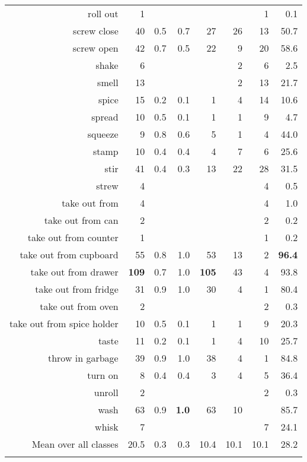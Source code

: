 \begin{tabular}{r r r@{\ \ }r@{\ \ }r@{\ \ }r@{\ \ }r r}
roll out & 1 &  &  &  &  & 1 & 0.1 \\
screw close & 40 & 0.5 & 0.7 & 27 & 26 & 13 & 50.7 \\
screw open & 42 & 0.7 & 0.5 & 22 & 9 & 20 & 58.6 \\
shake & 6 &  &  &  & 2 & 6 & 2.5 \\
smell & 13 &  &  &  & 2 & 13 & 21.7 \\
spice & 15 & 0.2 & 0.1 & 1 & 4 & 14 & 10.6 \\
spread & 10 & 0.5 & 0.1 & 1 & 1 & 9 & 4.7 \\
squeeze & 9 & 0.8 & 0.6 & 5 & 1 & 4 & 44.0 \\
stamp & 10 & 0.4 & 0.4 & 4 & 7 & 6 & 25.6 \\
stir & 41 & 0.4 & 0.3 & 13 & 22 & 28 & 31.5 \\
strew & 4 &  &  &  &  & 4 & 0.5 \\
take out from  & 4 &  &  &  &  & 4 & 1.0 \\
take out from can & 2 &  &  &  &  & 2 & 0.2 \\
take out from counter & 1 &  &  &  &  & 1 & 0.2 \\
take out from cupboard & 55 & 0.8 & 1.0 & 53 & 13 & 2 & \textbf{96.4} \\
take out from drawer & \textbf{109} & 0.7 & 1.0 & \textbf{105} & 43 & 4 & 93.8 \\
take out from fridge & 31 & 0.9 & 1.0 & 30 & 4 & 1 & 80.4 \\
take out from oven & 2 &  &  &  &  & 2 & 0.3 \\
take out from spice holder & 10 & 0.5 & 0.1 & 1 & 1 & 9 & 20.3 \\
taste & 11 & 0.2 & 0.1 & 1 & 4 & 10 & 25.7 \\
throw in garbage & 39 & 0.9 & 1.0 & 38 & 4 & 1 & 84.8 \\
turn on & 8 & 0.4 & 0.4 & 3 & 4 & 5 & 36.4 \\
unroll & 2 &  &  &  &  & 2 & 0.3 \\
wash & 63 & 0.9 & \textbf{1.0} & 63 & 10 &  & 85.7 \\
whisk & 7 &  &  &  &  & 7 & 24.1 \\
\cmidrule(lr){1-1} \cmidrule(lr){2-2} \cmidrule(lr){3-7} \cmidrule(lr){8-8}
Mean over all classes&20.5&0.3&0.3&10.4&10.1&10.1&28.2
\\ \bottomrule \\ \end{tabular}
